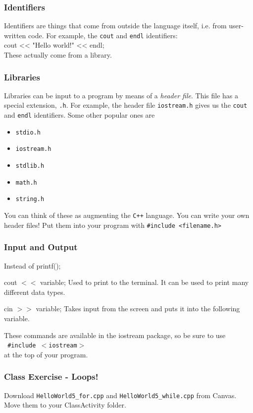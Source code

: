 \documentclass{if-beamer}
\begin{document}
\begin{frame}
\frametitle{Identifiers}
Identifiers are things that come from outside
the language itself, i.e. from user-written code. For example, the
\texttt{cout} and \texttt{endl} identifiers: \\[0.5cm]
{ \footnotesize 
cout << "Hello world!" << endl;
} \\[0.5cm]
These actually come from a library.
\end{frame}

\begin{frame}
\frametitle{Libraries}
Libraries can be input to a program by means of a \textit{header
file}. This file has a special extension, \texttt{.h}. For example,
the header file \texttt{iostream.h} gives us the \texttt{cout} and
\texttt{endl} identifiers. Some other popular ones are
\begin{itemize}
\item \texttt{stdio.h}
\item \texttt{iostream.h}
\item \texttt{stdlib.h}
\item \texttt{math.h}
\item \texttt{string.h}
\end{itemize}
You can think of these as augmenting the \texttt{C++} language. You
can write your own header files! Put them into your program with
\texttt{\#include <filename.h>}
\end{frame}

\begin{frame}
\frametitle{Input and Output}
Instead of printf();
\medskip

\begin{block}{cout $<<$ variable;}
	Used to print to the terminal. It can be used to print many different data types. 
\end{block}

\begin{block}{cin $>>$ variable;}
	Takes input from the screen and puts it into the following variable. 
\end{block}

These commands are available in the iostream package, so be sure to use \\
\texttt{ \#include $<$iostream$>$} \\
at the top of your program. 

\end{frame}

\begin{frame}
\frametitle{Class Exercise - Loops!}
	Download  \texttt{HelloWorld5\_for.cpp} and \texttt{HelloWorld5\_while.cpp} from Canvas. Move them to your ClassActivity folder. 

\end{frame}
\end{document}
